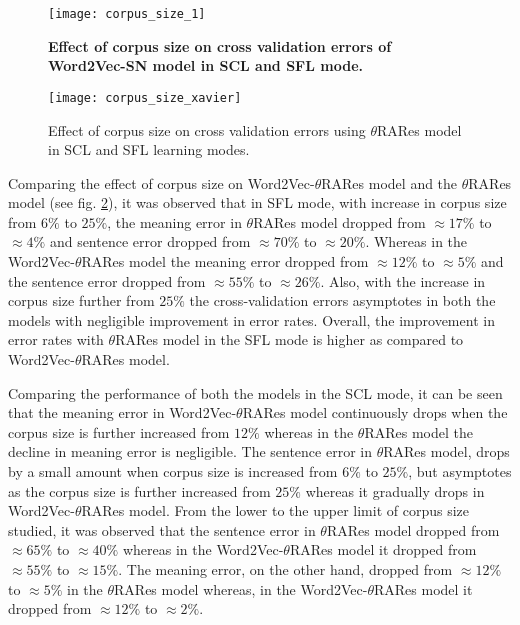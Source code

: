 \begin{figure}[hbtp]
\centering
\texttt{[image: corpus\_size\_1]}
\caption[Effect of corpus size on Word2Vec-$\theta$RARes model]{\textbf{Effect of corpus size on cross validation errors of Word2Vec-SN model in SCL and SFL mode.} }
\label{fig:corpus_size_1}
\end{figure}

\begin{figure}[hbtp]
\centering
\texttt{[image: corpus\_size\_xavier]}
\caption[Effect of corpous size on Word2Vec-$\theta$RARes model]{Effect of corpus size on cross validation errors using $\theta$RARes model in SCL and SFL learning modes.}
\label{fig:corpus_size_xavier}
\end{figure}

Comparing the effect of corpus size on Word2Vec-$\theta$RARes model and the $\theta$RARes model (see fig. \ref{fig:corpus_size_xavier}), it was observed that in SFL mode, with increase in corpus size from $6\%$ to $25\%$, the meaning error in $\theta$RARes model dropped from $\approx 17\%$ to $\approx 4\%$ and sentence error dropped from $\approx 70\%$ to $\approx 20\%$. Whereas in the Word2Vec-$\theta$RARes model the meaning error dropped from $\approx 12\%$ to $\approx 5\%$  and the sentence error dropped from $\approx 55\%$ to $\approx 26\%$. Also, with the increase in corpus size further from $25 \%$ the cross-validation errors asymptotes in both the models with negligible improvement in error rates. Overall, the improvement in error rates with $\theta$RARes model in the SFL mode is higher as compared to Word2Vec-$\theta$RARes model.

Comparing the performance of both the models in the SCL mode, it can be seen that the meaning error in Word2Vec-$\theta$RARes model continuously drops when the corpus size is further increased from $12 \%$ whereas in the $\theta$RARes model the decline in meaning error is negligible. The sentence error in $\theta$RARes model, drops by a small amount when corpus size is increased from $6 \% $ to $25 \%$, but asymptotes as the corpus size is further increased from $25\%$ whereas it gradually drops in Word2Vec-$\theta$RARes model. From the lower to the upper limit of corpus size studied, it was observed that the sentence error in $\theta$RARes model dropped from $\approx 65\%$ to $\approx 40\%$ whereas in the Word2Vec-$\theta$RARes model it dropped from $\approx 55\%$ to $\approx 15 \% $. The meaning error, on the other hand, dropped from $\approx 12\%$ to $\approx 5\%$ in the $\theta$RARes model whereas, in the Word2Vec-$\theta$RARes model it dropped from $\approx 12\%$ to $\approx 2\%$.

